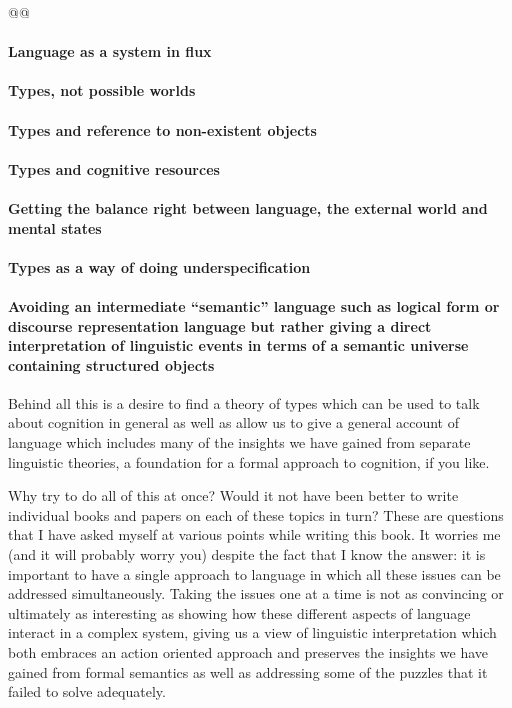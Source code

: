 @@

\paragraph{Language as a system in flux}

\paragraph{Types, not possible worlds}

\paragraph{Types and reference to non-existent objects}

\paragraph{Types and cognitive resources}

\paragraph{Getting the balance right between language, the external world
  and mental states}

\paragraph{Types as a way of doing underspecification}

\paragraph{Avoiding an intermediate ``semantic'' language such as logical
  form or discourse representation language but rather giving a direct
  interpretation of linguistic events in terms of a semantic
  universe containing structured objects}
 
Behind all this is a desire to find a theory of types which can be
used to talk about cognition in general as well as allow us to give a
general account of language which includes many of the insights we
have gained from separate linguistic theories, a foundation for a
formal approach to cognition, if you like.

Why try to do all of this at once?  Would it not have been better to
write individual books and papers on each of these topics in turn?
These are questions that I have asked myself at various points while
writing this book.  It worries me (and it will probably worry you)
despite the fact that I know the answer:  it is important to have a
single approach to language in which all these issues can be addressed
simultaneously.  Taking the issues one at a time is not as
convincing or ultimately as interesting as showing how these different
aspects of language interact in a complex system, giving us a view
of linguistic interpretation which both embraces an action oriented
approach and preserves the insights we have gained from formal
semantics as well as addressing some of the puzzles that it failed to
solve adequately.  


